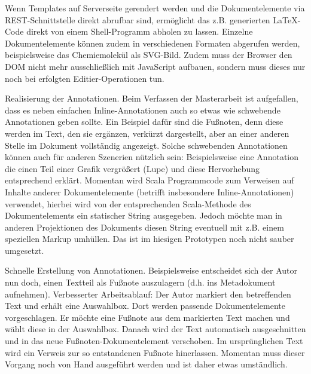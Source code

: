  
Wenn Templates auf Serverseite gerendert werden und die Dokumentelemente via REST-Schnittstelle direkt abrufbar sind, ermöglicht das z.B. generierten LaTeX-Code direkt von einem Shell-Programm abholen zu lassen. Einzelne Dokumentelemente können zudem in verschiedenen Formaten abgerufen werden, beispielsweise das Chemiemolekül als SVG-Bild. Zudem muss der Browser den DOM nicht mehr ausschließlich mit JavaScript aufbauen, sondern muss dieses nur noch bei erfolgten Editier-Operationen tun.

 
Realisierung der Annotationen. Beim Verfassen der Masterarbeit ist aufgefallen, dass es neben einfachen Inline-Annotationen auch so etwas wie schwebende Annotationen geben sollte. Ein Beispiel dafür sind die Fußnoten, denn diese werden im Text, den sie ergänzen, verkürzt dargestellt, aber an einer anderen Stelle im Dokument vollständig angezeigt. Solche schwebenden Annotationen können auch für anderen Szenerien nützlich sein: Beispielsweise eine Annotation die einen Teil einer Grafik vergrößert (Lupe) und diese Hervorhebung entsprechend erklärt. Momentan wird Scala Programmcode zum Verweisen auf Inhalte anderer Dokumentelemente (betrifft insbesondere Inline-Annotationen) verwendet, hierbei wird von der entsprechenden Scala-Methode des Dokumentelements ein statischer String ausgegeben. Jedoch möchte man in anderen Projektionen des Dokuments diesen String eventuell mit z.B. einem speziellen Markup umhüllen. Das ist im hiesigen Prototypen noch nicht sauber umgesetzt.

 
Schnelle Erstellung von Annotationen. Beispielsweise entscheidet sich der Autor nun doch, einen Textteil als Fußnote auszulagern (d.h. ins Metadokument aufnehmen). Verbesserter Arbeitsablauf: Der Autor markiert den betreffenden Text und erhält eine Auswahlbox. Dort werden passende Dokumentelemente vorgeschlagen. Er möchte eine Fußnote aus dem markierten Text machen und wählt diese in der Auswahlbox. Danach wird der Text automatisch ausgeschnitten und in das neue Fußnoten-Dokumentelement verschoben. Im ursprünglichen Text wird ein Verweis zur so entstandenen Fußnote hinerlassen. Momentan muss dieser Vorgang noch von Hand ausgeführt werden und ist daher etwas umständlich.

